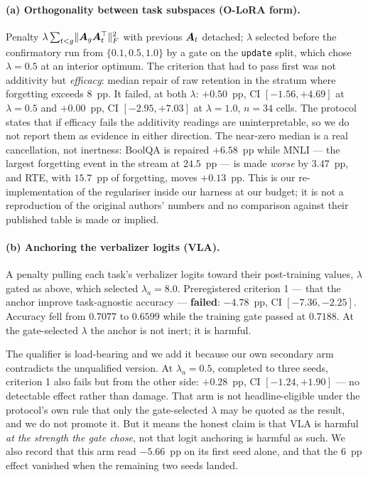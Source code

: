 \paragraph{(a) Orthogonality between task subspaces (O-LoRA form).}
\label{sec:2l}
Penalty $\lambda\sum_{t<g}\lVert \bm{A}_g\bm{A}_t^\top\rVert_F^2$ with previous $\bm{A}_t$
detached; $\lambda$ selected before the confirmatory run from $\{0.1,0.5,1.0\}$ by
a gate on the \texttt{update} split, which chose $\lambda=0.5$ at an interior
optimum. The criterion that had to pass first was not additivity but
\emph{efficacy}: median repair of raw retention in the stratum where forgetting
exceeds $8$~pp. It failed, at both $\lambda$: $+0.50$~pp, CI $[-1.56,+4.69]$ at
$\lambda=0.5$ and $+0.00$~pp, CI $[-2.95,+7.03]$ at $\lambda=1.0$, $n=34$ cells.
The protocol states that if efficacy fails the additivity readings are
uninterpretable, so we do not report them as evidence in either direction. The
near-zero median is a real cancellation, not inertness: BoolQA is repaired
$+6.58$~pp while MNLI --- the largest forgetting event in the stream at $24.5$~pp
--- is made \emph{worse} by $3.47$~pp, and RTE, with $15.7$~pp of forgetting, moves
$+0.13$~pp. This is our re-implementation of the regulariser inside our harness at
our budget; it is not a reproduction of the original authors' numbers and no
comparison against their published table is made or implied.

\paragraph{(b) Anchoring the verbalizer logits (VLA).}
A penalty pulling each task's verbalizer logits toward their post-training values,
$\lambda$ gated as above, which selected $\lambda_a=8.0$. Preregistered criterion 1
--- that the anchor improve task-agnostic accuracy --- \textbf{failed}:
$\mathbf{-4.78}$~pp, CI $[-7.36,-2.25]$. Accuracy fell from $0.7077$ to $0.6599$
while the training gate passed at $0.7188$. At the gate-selected $\lambda$ the
anchor is not inert; it is harmful.

The qualifier is load-bearing and we add it because our own secondary arm
contradicts the unqualified version. At $\lambda_a=0.5$, completed to three seeds,
criterion 1 also fails but from the other side: $+0.28$~pp, CI $[-1.24,+1.90]$ ---
no detectable effect rather than damage. That arm is not headline-eligible under the
protocol's own rule that only the gate-selected $\lambda$ may be quoted as the
result, and we do not promote it. But it means the honest claim is that VLA is
harmful \emph{at the strength the gate chose}, not that logit anchoring is harmful
as such. We also record that this arm read $-5.66$~pp on its first seed alone, and
that the $6$~pp effect vanished when the remaining two seeds landed.

